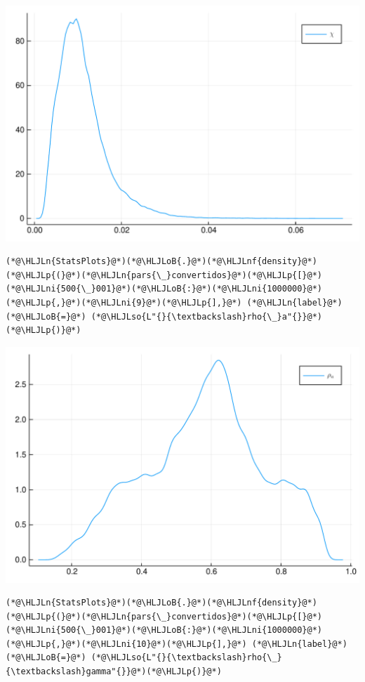 \documentclass[12pt,a4paper]{article}
\newcommand{\HLJLn}[1]{#1}
\newcommand{\HLJLnf}[1]{\textcolor[RGB]{66,102,213}{#1}}
\newcommand{\HLJLso}[1]{\textcolor[RGB]{201,61,57}{#1}}
\newcommand{\HLJLni}[1]{\textcolor[RGB]{59,151,46}{#1}}
\newcommand{\HLJLoB}[1]{\textcolor[RGB]{102,102,102}{\textbf{#1}}}
\newcommand{\HLJLp}[1]{#1}
\begin{document}
\includegraphics[width=\linewidth]{figures/carlos_mcmc_9_1.pdf}

\begin{lstlisting}
(*@\HLJLn{StatsPlots}@*)(*@\HLJLoB{.}@*)(*@\HLJLnf{density}@*)(*@\HLJLp{(}@*)(*@\HLJLn{pars{\_}convertidos}@*)(*@\HLJLp{[}@*)(*@\HLJLni{500{\_}001}@*)(*@\HLJLoB{:}@*)(*@\HLJLni{1000000}@*)(*@\HLJLp{,}@*)(*@\HLJLni{9}@*)(*@\HLJLp{],}@*) (*@\HLJLn{label}@*)(*@\HLJLoB{=}@*) (*@\HLJLso{L"{}{\textbackslash}rho{\_}a"{}}@*)(*@\HLJLp{)}@*)
\end{lstlisting}

\includegraphics[width=\linewidth]{figures/carlos_mcmc_10_1.pdf}

\begin{lstlisting}
(*@\HLJLn{StatsPlots}@*)(*@\HLJLoB{.}@*)(*@\HLJLnf{density}@*)(*@\HLJLp{(}@*)(*@\HLJLn{pars{\_}convertidos}@*)(*@\HLJLp{[}@*)(*@\HLJLni{500{\_}001}@*)(*@\HLJLoB{:}@*)(*@\HLJLni{1000000}@*)(*@\HLJLp{,}@*)(*@\HLJLni{10}@*)(*@\HLJLp{],}@*) (*@\HLJLn{label}@*)(*@\HLJLoB{=}@*) (*@\HLJLso{L"{}{\textbackslash}rho{\_}{\textbackslash}gamma"{}}@*)(*@\HLJLp{)}@*)
\end{lstlisting}
\end{document}
